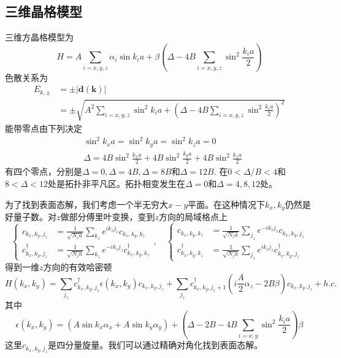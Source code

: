 \documentclass{article}
\numberwithin{equation}{subsection}
\begin{document}
\subsection{三维晶格模型}
三维方晶格模型为
\begin{equation}
    H=A \sum_{i=x, y, z} \alpha_{i} \sin k_{i} a+\beta\left(\Delta-4 B \sum_{i=x, y, z} \sin ^{2} \frac{k_{i} a}{2}\right)
\end{equation}
色散关系为
\begin{equation}
    \begin{split}
        E_{k,\pm}&=\pm|\mathbf{d}(\mathbf{k})|\\
        &=\pm \sqrt{A^{2} \sum_{i=x, y, z} \sin ^{2} k_{i} a+\left(\Delta-4 B \sum_{i=x, y, z} \sin ^{2} \frac{k_{i} a}{2}\right)^{2}}
    \end{split}
\end{equation}
能带零点由下列决定
\begin{equation}
    \begin{aligned}
        &\sin ^{2} k_{x} a=\sin ^{2} k_{y} a=\sin ^{2} k_{z} a=0\\
        &\Delta=4 B \sin ^{2} \frac{k_{x} a}{2}+4 B \sin ^{2} \frac{k_{y} a}{2}+4 B \sin ^{2} \frac{k_{z} a}{2}
        \end{aligned}
\end{equation}
有四个零点，分别是$\Delta=0,\Delta=4B,\Delta=8B$和$\Delta=12B$. 在$0<\Delta/B<4$和$8<\Delta<12$处是拓扑非平凡区。拓扑相变发生在$\Delta=0$和$\Delta=4,8,12$处。

为了找到表面态解，我们考虑一个半无穷大$x-y$平面。在这种情况下$k_x,k_y$仍然是好量子数。对$z$做部分傅里叶变换，变到$z$方向的局域格点上
\begin{equation}
    \begin{cases}
        c_{k_x,k_y,j_z}&=\frac{1}{\sqrt{N_za}}\sum_{k_z}e^{ik_zj_z}c_{k_x,k_y,k_z}\\
        c_{k_x,k_y,j_z}^\dagger&=\frac{1}{\sqrt{N_za}}\sum_{k_z}e^{-ik_zj_z}c_{k_x,k_y,k_z}^\dagger
    \end{cases},\quad\begin{cases}
        c_{k_x,k_y,k_z}&=\frac{1}{\sqrt{N_za}}\sum_{j_z}e^{-ik_zj_z}c_{k_x,k_y,j_z}\\
        c_{k_x,k_y,k_z}^\dagger&=\frac{1}{\sqrt{N_za}}\sum_{j_z}e^{ik_zj_z}c_{k_x,k_y,j_z}^\dagger
    \end{cases}
\end{equation}
得到一维$z$方向的有效哈密顿
\begin{equation}
    H(k_x,k_y)=\sum_{j_z}c_{k_{x}, k_{y}, j_{z}}^{\dagger} \epsilon\left(k_{x}, k_{y}\right) c_{k_{x}, k_{y}, j_{z}}+\sum_{j_z} c_{k_{x}, k_{y}, j_{z}+1}^{\dagger}\left(i \frac{A}{2} \alpha_{z}-2 B \beta\right) c_{k_{x}, k_{y}, j_{z}}+h . c .
\end{equation}
其中
\begin{equation}
    \epsilon\left(k_{x}, k_{y}\right)=\left(A \sin k_{x} \alpha_{x}+A \sin k_{y} \alpha_{y}\right)+\left(\Delta-2 B-4 B \sum_{i=x, y} \sin ^{2} \frac{k_{i} a}{2}\right) \beta
\end{equation}
这里$c_{k_x,k_y,j_z}$是四分量旋量。我们可以通过精确对角化找到表面态解。
\end{document}
